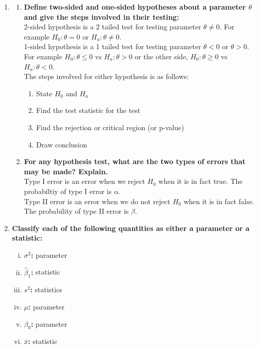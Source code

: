 \documentclass{article}
\begin{document}
\begin{enumerate}[1.]
\item
\begin{enumerate}[a]
  \item \textbf{Define two-sided and one-sided hypotheses about a parameter $\theta$ and give the steps involved in their testing: }
\\
2-sided hypothesis is a 2 tailed test for testing parameter $\theta \neq 0$. For example $H_0 : \theta = 0$ or $H_a : \theta \neq 0$.
\\
1-sided hypothesis is a 1 tailed test for testing parameter $\theta < 0$ or $\theta > 0$. For example $H_0 : \theta \leq 0$ vs $H_a: \theta > 0$ or the other side, $H_0 : \theta \geq 0$ vs $H_a : \theta < 0$.
\\
The steps involved for either hypothesis is as follows:
\begin{enumerate}[1)]
  \item State $H_0$ and $H_a$
  \item Find the test statistic for the test
  \item Find the rejection or critical region (or p-value)
  \item Draw conclusion
\end{enumerate}

  \item \textbf{For any hypothesis test, what are the two types of errors that may be made? Explain.}
\\
Type I error is an  error when we reject $H_0$ when it is in fact true. The probabiltiy of type I error is $\alpha$.
\\
Type II error is an error when we do not reject $H_0$ when it is in fact false. The probability of type II error is $\beta$.
\end{enumerate}

\item
\textbf{Classify each of the following quantities as either a parameter or a statistic:}
\begin{enumerate}[(i)]
  \item \textbf{$\sigma^2$: } parameter
  \item \textbf{$\hat{\beta}_1$: } statistic
  \item \textbf{$s^2$: } statistics
  \item \textbf{$\mu$: } parameter
  \item \textbf{$\beta_0$: } parameter
  \item \textbf{$\bar{x}$: } statistic
\end{enumerate}


\end{enumerate}
\end{document}
